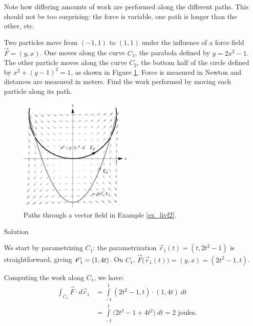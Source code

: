 \begin{example}
Note how differing amounts of work are performed along the different paths. This should not be too surprising: the force is variable, one path is longer than the other, etc.
\end{example}

\begin{example}\label{ex_livf2}
Two particles move from $(-1,1)$ to $(1,1)$ under the influence of a force field $\vec F = \left( y, x\right)$. One moves along the curve $C_1$, the parabola defined by $y = 2x^2-1$. The other particle moves along the curve $C_2$, the bottom half of the circle defined by $x^2+(y-1)^2=1$, as shown in Figure \ref{fig_Vector_Calc_9}. Force is measured in Newton and distances are measured in meters. Find the work performed by moving each particle along its path.

\begin{figure}[H]
	\begin{center}
			\includegraphics[width=0.5\textwidth]{fig_Vector_Calc_9}
	\caption{Paths through a vector field in Example \ref{ex_livf2}.}
	\label{fig_Vector_Calc_9}
	\end{center}
\end{figure}


Solution 

We start by parametrizing $C_1$: the parametrization $\vec r_1(t) = \left( t, 2t^2-1\right)$ is straightforward, giving $\vrp_1 = \left( 1,4t\right)$. On $C_1$, $\vec F\big(\vec r_1(t)\big) = \left( y,x\right) = \left( 2t^2-1,t\right)$.


Computing the work along $C_1$, we have:
\begin{align*}
\int_{C_1} \vec F\cdot d\vec r_1 & = \int\limits_{-1}^1 \left( 2t^2-1,t\right)\cdot\left( 1,4t\right)\ dt \\
		&= \int\limits_{-1}^1 \big(2t^2-1+4t^2\big)\ dt = 2 \text{ joules}.
\end{align*}






\end{example}
